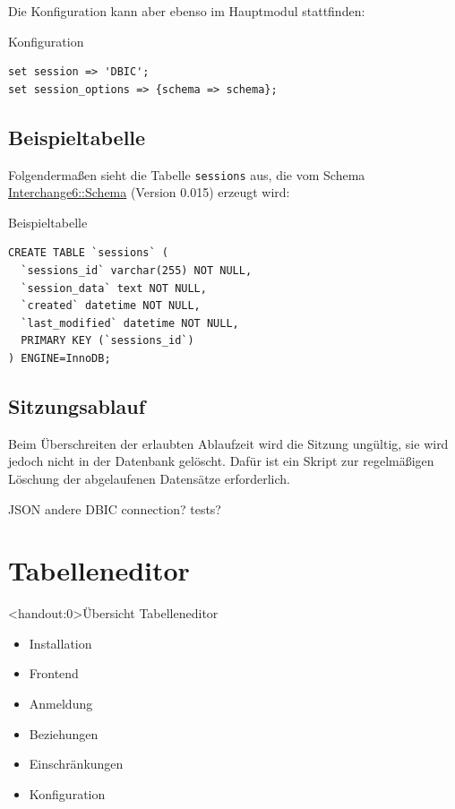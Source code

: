 Die Konfiguration kann aber ebenso im Hauptmodul
stattfinden:

\begin{frame}[fragile]{Konfiguration}
\begin{lstlisting}
set session => 'DBIC';
set session_options => {schema => schema};
\end{lstlisting}
\end{frame}

\subsection{Beispieltabelle}

Folgendermaßen sieht die Tabelle \verb|sessions| aus,
die vom Schema \href{https://metacpan.org/pod/Interchange6::Schema}{Interchange6::Schema} (Version 0.015)
erzeugt wird:

\begin{frame}[fragile]{Beispieltabelle}
\begin{lstlisting}
CREATE TABLE `sessions` (
  `sessions_id` varchar(255) NOT NULL,
  `session_data` text NOT NULL,
  `created` datetime NOT NULL,
  `last_modified` datetime NOT NULL,
  PRIMARY KEY (`sessions_id`)
) ENGINE=InnoDB;
\end{lstlisting}
\end{frame}

\subsection{Sitzungsablauf}

Beim Überschreiten der erlaubten Ablaufzeit wird die Sitzung
ungültig, sie wird jedoch nicht in der Datenbank gelöscht.
Dafür ist ein Skript zur regelmäßigen Löschung der
abgelaufenen Datensätze erforderlich.

JSON
andere DBIC connection?
tests?

\section{Tabelleneditor}

\begin{frame}<handout:0>{Übersicht Tabelleneditor}
\begin{itemize}
\item Installation
\item Frontend
\item Anmeldung
\item Beziehungen
\item Einschränkungen
\item Konfiguration
\end{itemize}
\end{frame}

